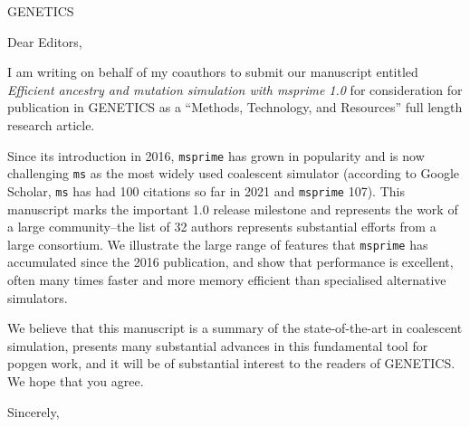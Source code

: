 \documentclass{letter}
\begin{document}
\begin{letter}{GENETICS}

\opening{Dear Editors,}

I am writing on behalf of my coauthors to submit our manuscript entitled
\emph{Efficient ancestry and mutation simulation with msprime 1.0}
for consideration for publication in GENETICS
as a ``Methods, Technology, and Resources'' full length research article.


Since its introduction in 2016, \texttt{msprime} has grown in popularity
and is now challenging \texttt{ms} as the most widely used coalescent simulator
(according to Google Scholar, \texttt{ms} has had 100 citations so far
in 2021 and \texttt{msprime} 107). This manuscript marks the important
1.0 release milestone and represents the work
of a large community--the list of 32 authors represents substantial efforts from a large consortium. We illustrate the large range of features
that \texttt{msprime} has accumulated since the 2016 publication,
and show that performance is excellent,
often many times faster and more memory efficient than specialised
alternative simulators.

We believe that this manuscript is a summary of the state-of-the-art
in coalescent simulation, presents many substantial advances in this fundamental tool for popgen work, and it will be of substantial
interest to the readers of GENETICS. We hope that you agree.

\closing{Sincerely,}

\end{letter}
\end{document}
